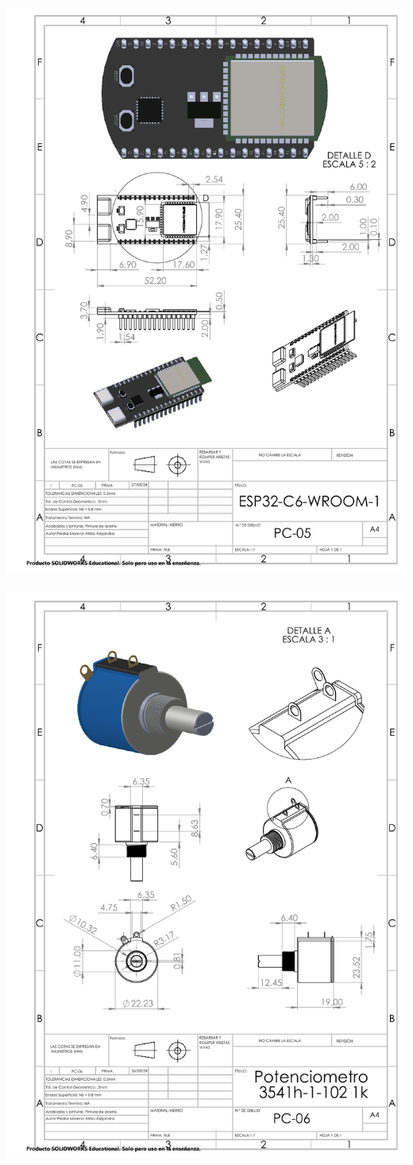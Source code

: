 \begin{center}
\includegraphics[width=.9\textwidth]{22/img/esp32Dibujo.pdf}~\\[15cm]

\includegraphics[width=.9\textwidth]{22/img/potenciometroDibujo.PDF}~\\[15cm]


\end{center}
